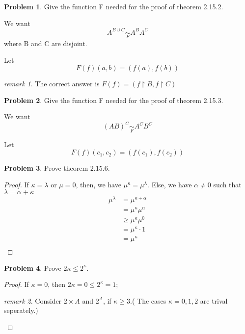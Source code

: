 \documentclass[a4paper,11pt]{article}%
\theoremstyle{remark}
\newtheorem*{remark}{remark}
\theoremstyle{definition}
\newtheorem{problem}{Problem}[subsection]
\begin{document}
\begin{problem}
    Give the function F needed for the proof of theorem 2.15.2.

    We want 
    \[A^{B\cup C}\underset{F}{\sim}A^BA^C\]
    where B and C are disjoint.

    Let 
    \[F(f)(a,b)=(f(a),f(b))\]
    \begin{remark}
        The correct answer is $F(f)=(f\upharpoonright B,f\upharpoonright C)$
    \end{remark}
\end{problem}
\begin{problem}
    Give the function F needed for the proof of theorem 2.15.3.

    We want
    \[(AB)^C\underset{F}{\sim}A^CB^C\]

    Let
\[F(f)(c_1,c_2)=(f(c_1),f(c_2))\]
\end{problem}
\begin{problem}
    Prove theorem 2.15.6.
    \begin{proof}
        If $\kappa=\lambda$ or $\mu=0$, then, we have $\mu^{\kappa}=\mu^{\lambda}$.
        Else, we have $\alpha\neq 0$ such that $\lambda=\alpha+\kappa$
        \[\begin{array}{rl}
           \mu^{\lambda}&=\mu^{\kappa+\alpha}\\
                        &=\mu^{\kappa}\mu^{\alpha}\\
                        &\geq\mu^{\kappa}\mu^{0}\\
                        &=\mu^{\kappa}\cdot 1\\
                        &=\mu^{\kappa}\\
        \end{array}\]
    \end{proof}
\end{problem}
\begin{problem}
    Prove $2\kappa\leq 2^{\kappa}$.
    \begin{proof}
    If $\kappa=0$, then $2\kappa=0\leq 2^{\kappa}=1$;
    
    \begin{remark}
        Consider $2\times A$ and $2^A$, if $\kappa\geq 3$.( The cases $\kappa=0,1,2$ are trival seperately.)
    \end{remark}
    \end{proof}
\end{problem}
\end{document}
